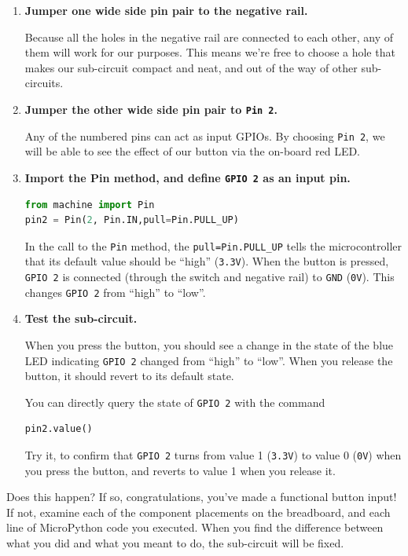 \begin{enumerate}
	\item  \textbf{Jumper one wide side pin pair to the negative rail.}
	
	Because all the holes in the negative rail are connected to each other, any of them will work for our purposes. This means we're free to choose a hole that makes our sub-circuit compact and neat, and out of the way of other sub-circuits. 

	\item  \textbf{Jumper the other wide side pin pair to \texttt{Pin 2}.}
	
	Any of the numbered pins can act as input GPIOs. By choosing \texttt{Pin 2}, we will be able to see the effect of our button via the on-board red LED.
	

	\item \textbf{Import the Pin method, and define \texttt{GPIO 2} as an input pin.}
\begin{lstlisting}[language=Python]
from machine import Pin 
pin2 = Pin(2, Pin.IN,pull=Pin.PULL_UP) 
\end{lstlisting}	
	In the call to the \texttt{Pin} method, the \texttt{pull=Pin.PULL\_UP} tells the microcontroller that its default value should be ``high'' (\texttt{3.3V}). When the button is pressed, \texttt{GPIO 2} is connected (through the switch and negative rail) to \texttt{GND} (\texttt{0V}). This changes \texttt{GPIO 2} from ``high'' to ``low''.

	\item \textbf{Test the sub-circuit.}
	
	When you press the button, you should see a change in the state of the blue LED indicating \texttt{GPIO 2} changed from ``high'' to ``low''. 
	When you release the button, it should revert to its default state. 
	
	You can directly query the state of \texttt{GPIO 2} with the command
\begin{lstlisting}[language=Python]
pin2.value() 
\end{lstlisting}	
	Try it, to confirm that \texttt{GPIO 2} turns from value 1 (\texttt{3.3V}) to value 0 (\texttt{0V}) when you press the button, and reverts to value 1 when you release it.
	
\end{enumerate}
Does this happen? 
If so, congratulations, you've made a functional button input! 
If not, examine each of the component placements on the breadboard, and each line of MicroPython code you executed. 
When you find the difference between what you did and what you meant to do, the sub-circuit will be fixed.

